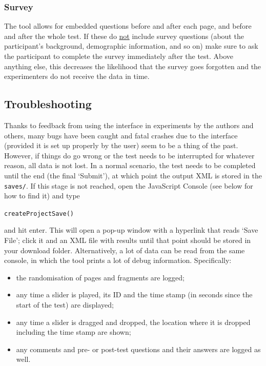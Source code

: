 \documentclass[11pt, oneside]{article}   	%
\begin{document}
			
		\subsubsection{Survey}
			The tool allows for embedded questions before and after each page, and before and after the whole test. If these do \underline{not} include survey questions (about the participant's background, demographic information, and so on) make sure to ask the participant to complete the survey immediately after the test. Above anything else, this decreases the likelihood that the survey goes forgotten and the experimenters do not receive the data in time. 
	
	
	\subsection{Troubleshooting} \label{sec:troubleshooting}
		Thanks to feedback from using the interface in experiments by the authors and others, many bugs have been caught and fatal crashes due to the interface (provided it is set up properly by the user) seem to be a thing of the past. 
		However, if things do go wrong or the test needs to be interrupted for whatever reason, all data is not lost. In a normal scenario, the test needs to be completed until the end (the final `Submit'), at which point the output XML is stored in the \texttt{saves/}. If this stage is not reached, open the JavaScript Console (see below for how to find it) and type 

		\texttt{createProjectSave()}

		and hit enter. This will open a pop-up window with a hyperlink that reads `Save File'; click it and an XML file with results until that point should be stored in your download folder. 
		Alternatively, a lot of data can be read from the same console, in which the tool prints a lot of debug information. Specifically:
            	\begin{itemize}
            	\item the randomisation of pages and fragments are logged;
            	\item any time a slider is played, its ID and the time stamp (in seconds since the start of the test) are displayed;
            	\item any time a slider is dragged and dropped, the location where it is dropped including the time stamp are shown; 
            	\item any comments and pre- or post-test questions and their answers are logged as well. 
            	\end{itemize}
\end{document}
